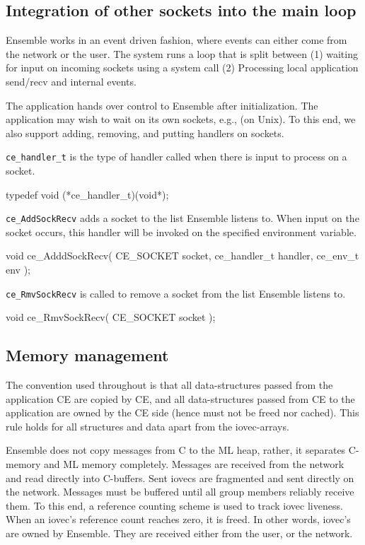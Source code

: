 \subsection{Integration of other sockets into the main loop}
Ensemble works in an event driven fashion, where events can either
come from the network or the user. The system runs a loop that is
split between (1) waiting for input on incoming sockets using a
 system call (2) Processing local
application send/recv and internal events. 

The application hands over control to Ensemble after initialization.
The application may wish to wait on its own sockets, e.g.,  (on
Unix). To this end, we also support adding, removing, and putting
handlers on sockets.

{\tt ce\_handler\_t} is the type of handler called when there is input
to process on a socket.
\begin{codebox}
typedef void (*ce_handler_t)(void*);
\end{codebox}

{\tt ce\_AddSockRecv} adds a socket to the list Ensemble listens to. 
When input on the socket occurs, this handler will be invoked
on the specified environment variable.
\begin{codebox}
void ce_AdddSockRecv(
    CE_SOCKET socket,
    ce_handler_t handler,
    ce_env_t env
);
\end{codebox}

{\tt ce\_RmvSockRecv} is called to remove a socket from the list 
Ensemble listens to.
\begin{codebox}
void ce_RmvSockRecv(
    CE_SOCKET socket
);
\end{codebox}


\subsection{Memory management}
The convention used throughout is that all data-structures passed from
the application CE are copied by CE, and all data-structures passed
from CE to the application are owned by the CE side (hence must not be
freed nor cached). This rule holds for all structures and data apart
from the iovec-arrays.

Ensemble does not copy messages from C to the ML heap, rather, it
separates C-memory and ML memory completely. Messages are received
from the network and read directly into C-buffers. Sent iovecs are
fragmented and sent directly on the network. Messages must be buffered
until all group members reliably receive them. To this end, a
reference counting scheme is used to track iovec liveness. When an
iovec's reference count reaches zero, it is freed. In other words,
iovec's are owned by Ensemble. They are received either from the 
user, or the network.


